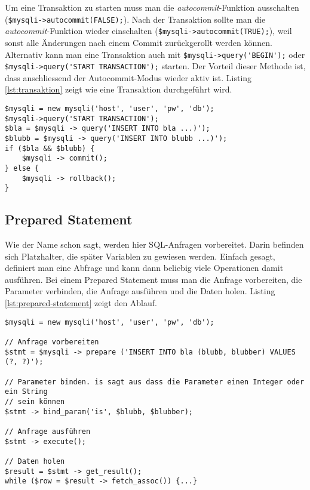Um eine Transaktion zu starten muss man die \textit{autocommit}-Funktion ausschalten \\ (\verb|$mysqli->autocommit(FALSE);|). Nach der Transaktion sollte man die \textit{autocommit}-Funktion wieder einschalten (\verb|$mysqli->autocommit(TRUE);|), weil sonst alle Änderungen nach einem Commit zurückgerollt werden können. Alternativ kann man eine Transaktion auch mit \verb|$mysqli->query('BEGIN');| oder \verb|$mysqli->query('START TRANSACTION');| starten. Der Vorteil dieser Methode ist, dass anschliessend der Autocommit-Modus wieder aktiv ist. Listing \ref{lst:transaktion} zeigt wie eine Transaktion durchgeführt wird. 

\begin{lstlisting}[caption=Transaktion, label=lst:transaktion]
$mysqli = new mysqli('host', 'user', 'pw', 'db');
$mysqli->query('START TRANSACTION');
$bla = $mysqli -> query('INSERT INTO bla ...)');
$blubb = $mysqli -> query('INSERT INTO blubb ...)');
if ($bla && $blubb) {
	$mysqli -> commit();
} else {
	$mysqli -> rollback();
}
\end{lstlisting}

\subsection{Prepared Statement}

Wie der Name schon sagt, werden hier SQL-Anfragen vorbereitet. Darin befinden sich Platzhalter, die später Variablen zu gewiesen werden. Einfach gesagt, definiert man eine Abfrage und kann dann beliebig viele Operationen damit ausführen. Bei einem Prepared Statement muss man die Anfrage vorbereiten, die Parameter verbinden, die Anfrage ausführen und die Daten holen. Listing \ref{lst:prepared-statement} zeigt den Ablauf.

\begin{lstlisting}[caption=Prepared Statement, label=lst:prepared-statement]
$mysqli = new mysqli('host', 'user', 'pw', 'db');

// Anfrage vorbereiten
$stmt = $mysqli -> prepare ('INSERT INTO bla (blubb, blubber) VALUES (?, ?)');

// Parameter binden. is sagt aus dass die Parameter einen Integer oder ein String 
// sein können
$stmt -> bind_param('is', $blubb, $blubber);

// Anfrage ausführen
$stmt -> execute();

// Daten holen
$result = $stmt -> get_result();
while ($row = $result -> fetch_assoc()) {...}
\end{lstlisting}

